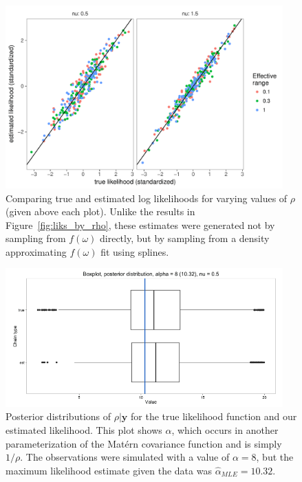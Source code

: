 \documentclass[12pt]{article}
\begin{document}
\begin{figure}[!htb]
  \centering
  \includegraphics[width=0.95\textwidth]{lik_true_vs_est2.pdf}
  \caption{\small Comparing true and estimated log likelihoods for varying values of $\rho$ (given above each plot). Unlike the results in Figure~\ref{fig:liks_by_rho}, these estimates were generated not by sampling from $f(\omega)$ directly, but by sampling from a density approximating $f(\omega)$ fit using splines.}
  \label{fig:estliks_spline_rho}
\end{figure}


\begin{figure}[htbp]
  \centering
  \includegraphics[width=0.95\textwidth]{est_vs_true_8_0-5_2.png}
  \caption{Posterior distributions of $\rho|\bm{y}$ for the true likelihood function and our estimated likelihood. This plot shows $\alpha$, which occurs in another parameterization of the Mat\'ern covariance function and is simply $1/\rho$. The observations were simulated with a value of $\alpha = 8$, but the maximum likelihood estimate given the data was $\hat{\alpha}_{MLE} = 10.32$.}
  \label{fig:compare-one}
\end{figure}
\end{document}
